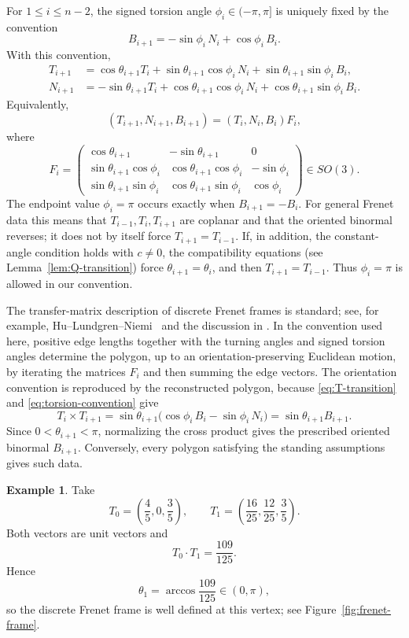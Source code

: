 \documentclass[10pt,a4paper]{amsart}
\theoremstyle{definition}
\newtheorem{example}[theorem]{Example}
\theoremstyle{remark}
\numberwithin{equation}{section}
\begin{document}
For \(1\le i\le n-2\), the signed torsion angle
\(\phi_i\in(-\pi,\pi]\) is uniquely fixed by the convention
\begin{equation}
B_{i+1}=-\sin\phi_i\,N_i+\cos\phi_i\,B_i.
\label{eq:torsion-convention}
\end{equation}
With this convention,
\begin{align}
T_{i+1}
&=\cos\theta_{i+1}T_i
+\sin\theta_{i+1}\cos\phi_i\,N_i
+\sin\theta_{i+1}\sin\phi_i\,B_i,
\label{eq:T-transition}\\
N_{i+1}
&=-\sin\theta_{i+1}T_i
+\cos\theta_{i+1}\cos\phi_i\,N_i
+\cos\theta_{i+1}\sin\phi_i\,B_i.
\label{eq:N-transition}
\end{align}
Equivalently,
\[
(T_{i+1},N_{i+1},B_{i+1})=(T_i,N_i,B_i)F_i,
\]
where
\[
F_i=
\begin{pmatrix}
\cos\theta_{i+1}&-\sin\theta_{i+1}&0\\
\sin\theta_{i+1}\cos\phi_i&
\cos\theta_{i+1}\cos\phi_i&
-\sin\phi_i\\
\sin\theta_{i+1}\sin\phi_i&
\cos\theta_{i+1}\sin\phi_i&
\cos\phi_i
\end{pmatrix}\in SO(3).
\]
The endpoint value $\phi_i=\pi$ occurs exactly when $B_{i+1}=-B_i$.  For general Frenet data this means that $T_{i-1},T_i,T_{i+1}$ are coplanar and that the oriented binormal reverses; it does not by itself force $T_{i+1}=T_{i-1}$.  If, in addition, the constant-angle condition holds with $c\ne0$, the compatibility equations (see Lemma~\ref{lem:Q-transition}) force $\theta_{i+1}=\theta_i$, and then $T_{i+1}=T_{i-1}$.  Thus $\phi_i=\pi$ is allowed in our convention.

The transfer-matrix description of discrete Frenet frames is standard; see, for example, Hu--Lundgren--Niemi~\cite{HuLundgrenNiemi2011} and the discussion in \cite{Hoffmann2026}. In the convention used here, positive edge lengths together with the turning angles and signed torsion angles determine the polygon, up to an orientation-preserving Euclidean motion, by iterating the matrices $F_i$ and then summing the edge vectors. The orientation convention is reproduced by the reconstructed polygon, because \eqref{eq:T-transition} and \eqref{eq:torsion-convention} give
\[
T_i\times T_{i+1}
=\sin\theta_{i+1}
\bigl(\cos\phi_i\,B_i-\sin\phi_i\,N_i\bigr)
=\sin\theta_{i+1}B_{i+1}.
\]
Since $0<\theta_{i+1}<\pi$, normalizing the cross product gives the prescribed oriented binormal $B_{i+1}$. Conversely, every polygon satisfying the standing assumptions gives such data.

\begin{example}\label{ex:frame-basic}
Take
\[
T_0=\left(\frac45,0,\frac35\right),
\qquad
T_1=\left(\frac{16}{25},\frac{12}{25},\frac35\right).
\]
Both vectors are unit vectors and
\[
T_0\cdot T_1=\frac{109}{125}.
\]
Hence
\[
\theta_1=\arccos\frac{109}{125}\in(0,\pi),
\]
so the discrete Frenet frame is well defined at this vertex; see Figure~\ref{fig:frenet-frame}.
\end{example}
\end{document}
